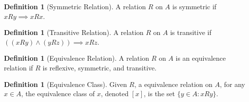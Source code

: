 \documentclass[10pt]{article}
\theoremstyle{definition}
\newtheorem{definition}[equation]{Definition}
\begin{document}
\begin{definition}[Symmetric Relation]
  A relation $R$ on $A$ is symmetric if $xRy\implies xRx$.
\end{definition}

\begin{definition}[Transitive Relation]
  A relation $R$ on $A$ is transitive if $((xRy)\land(yRz))\implies xRz$.
\end{definition}

\begin{definition}[Equivalence Relation]
  A relation $R$ on $A$ is an equivalence relation if $R$ is reflexive, symmetric, and transitive.
\end{definition}

\begin{definition}[Equivalence Class]
  Given $R$, a equivalence relation on $A$, for any $x\in A$, the equivalence class of $x$, denoted $[x]$, is the set $\{y\in A: xRy\}$.
\end{definition}
\end{document}

